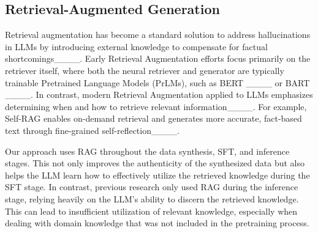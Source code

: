 \subsection{Retrieval-Augmented Generation}
Retrieval augmentation has become a standard solution to address hallucinations in LLMs by introducing external knowledge to compensate for factual shortcomings____.
Early Retrieval Augmentation efforts focus primarily on the retriever itself, where both the neural retriever and generator are typically trainable Pretrained Language Models (PrLMs), such as BERT ____ or BART ____. In contrast, modern Retrieval Augmentation applied to LLMs emphasizes determining when and how to retrieve relevant information____. For example, Self-RAG enables on-demand retrieval and generates more accurate, fact-based text through fine-grained self-reflection____. 

Our approach uses RAG throughout the data synthesis, SFT, and inference stages. This not only improves the authenticity of the synthesized data but also helps the LLM learn how to effectively utilize the retrieved knowledge during the SFT stage. In contrast, previous research only used RAG during the inference stage, relying heavily on the LLM's ability to discern the retrieved knowledge. This can lead to insufficient utilization of relevant knowledge, especially when dealing with domain knowledge that was not included in the pretraining process.